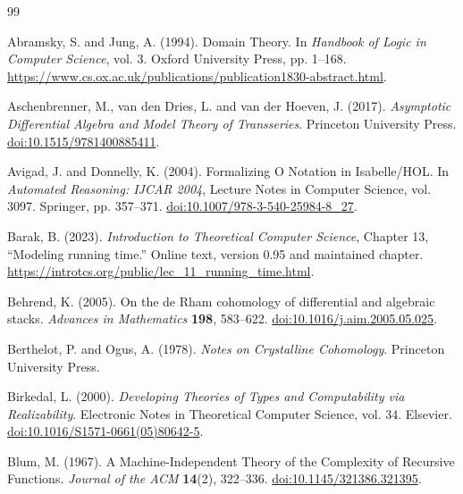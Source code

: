 \documentclass[11pt,a4paper]{article}
\numberwithin{algorithm}{section}
\numberwithin{equation}{section}
\theoremstyle{definition}
\theoremstyle{remark}
\theoremstyle{plain}
\theoremstyle{definition}
\theoremstyle{plain}
\begin{document}
\begin{thebibliography}{99}
\raggedright

Abramsky, S. and Jung, A. (1994).
Domain Theory.
In \emph{Handbook of Logic in Computer Science}, vol. 3. Oxford University Press, pp. 1--168.
\url{https://www.cs.ox.ac.uk/publications/publication1830-abstract.html}.

Aschenbrenner, M., van den Dries, L. and van der Hoeven, J. (2017).
\emph{Asymptotic Differential Algebra and Model Theory of Transseries}.
Princeton University Press.
\href{https://doi.org/10.1515/9781400885411}{doi:10.1515/9781400885411}.

Avigad, J. and Donnelly, K. (2004).
Formalizing {O} Notation in {Isabelle/HOL}.
In \emph{Automated Reasoning: IJCAR 2004}, Lecture Notes in Computer Science, vol. 3097. Springer, pp. 357--371.
\href{https://doi.org/10.1007/978-3-540-25984-8_27}{doi:10.1007/978-3-540-25984-8\_27}.

Barak, B. (2023).
\emph{Introduction to Theoretical Computer Science}, Chapter 13,
``Modeling running time.'' Online text, version 0.95 and maintained
chapter.
\url{https://introtcs.org/public/lec_11_running_time.html}.

Behrend, K. (2005).
On the de Rham cohomology of differential and algebraic stacks.
\emph{Advances in Mathematics} \textbf{198}, 583--622.
\href{https://doi.org/10.1016/j.aim.2005.05.025}{doi:10.1016/j.aim.2005.05.025}.

Berthelot, P. and Ogus, A. (1978).
\emph{Notes on Crystalline Cohomology}.
Princeton University Press.

Birkedal, L. (2000).
\emph{Developing Theories of Types and Computability via Realizability}.
Electronic Notes in Theoretical Computer Science, vol. 34.
Elsevier.
\href{https://doi.org/10.1016/S1571-0661(05)80642-5}{doi:10.1016/S1571-0661(05)80642-5}.

Blum, M. (1967).
A Machine-Independent Theory of the Complexity of Recursive Functions.
\emph{Journal of the ACM} \textbf{14}(2), 322--336.
\href{https://doi.org/10.1145/321386.321395}{doi:10.1145/321386.321395}.


\end{thebibliography}
\end{document}
